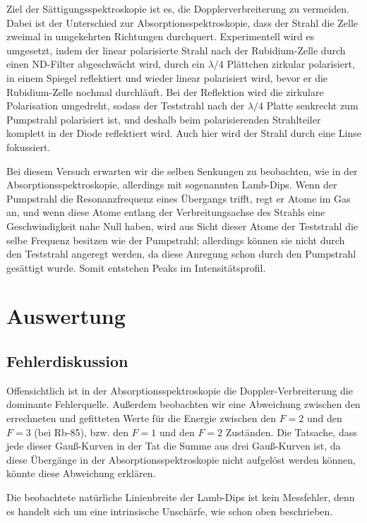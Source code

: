 \documentclass[a4paper,parskip]{scrartcl}
\begin{document}
Ziel der Sättigungsspektroskopie ist es, die Dopplerverbreiterung zu vermeiden. Dabei ist der Unterschied zur Absorptionsspektroskopie, dass der Strahl die Zelle zweimal in umgekehrten Richtungen durchquert. Experimentell wird es umgesetzt, indem der linear polarisierte Strahl nach der Rubidium-Zelle durch einen ND-Filter abgeschwächt wird, durch ein $\lambda/4$ Plättchen zirkular polarisiert, in einem Spiegel reflektiert und wieder linear polarisiert wird, bevor er die Rubidium-Zelle nochmal durchläuft. Bei der Reflektion wird die zirkulare Polarisation umgedreht, sodass der Teststrahl nach der $\lambda/4$ Platte senkrecht zum Pumpstrahl polarisiert ist, und deshalb beim polarisierenden Strahlteiler komplett in der Diode reflektiert wird. Auch hier wird der Strahl durch eine Linse fokussiert.

Bei diesem Versuch erwarten wir die selben Senkungen zu beobachten, wie in der Absorptionsspektroskopie, allerdings mit sogenannten Lamb-Dips. Wenn der Pumpstrahl die Resonanzfrequenz eines Übergangs trifft, regt er Atome im Gas an, und wenn diese Atome entlang der Verbreitungsachse des Strahls eine Geschwindigkeit nahe Null haben, wird aus Sicht dieser Atome der Teststrahl die selbe Frequenz besitzen wie der Pumpstrahl; allerdings können sie nicht durch den Teststrahl angeregt werden, da diese Anregung schon durch den Pumpstrahl gesättigt wurde. Somit entstehen Peaks im Intensitätsprofil.

\section{Auswertung}

\subsection{Fehlerdiskussion}

Offensichtlich ist in der Absorptionsspektroskopie die Doppler-Verbreiterung die dominante Fehlerquelle. Außerdem beobachten wir eine Abweichung zwischen den errechneten und gefitteten Werte für die Energie zwischen den $F=2$ und den $F=3$ (bei Rb-85), bzw. den $F=1$ und den $F=2$ Zuständen. Die Tatsache, dass jede dieser Gauß-Kurven in der Tat die Summe aus drei Gauß-Kurven ist, da diese Übergänge in der Absorptionsspektroskopie nicht aufgelöst werden können, könnte diese Abweichung erklären.

Die beobachtete natürliche Linienbreite der Lamb-Dips ist kein Messfehler, denn es handelt sich um eine intrinsische Unschärfe, wie schon oben beschrieben.
\end{document}
